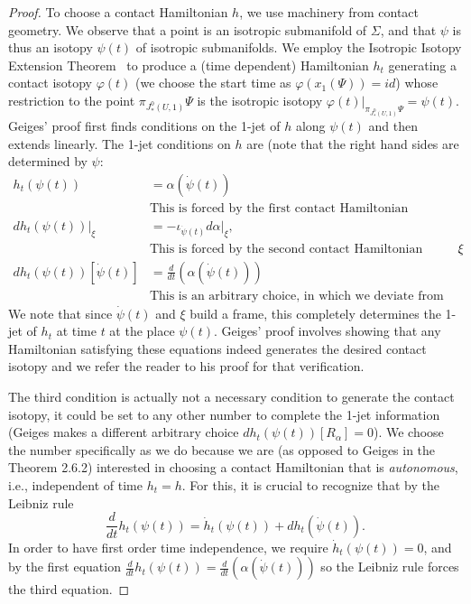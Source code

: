 \documentclass{amsart}
\theoremstyle{definition}
\theoremstyle{remark}
\numberwithin{equation}{section}
\begin{document}
\begin{proof}
    To choose a contact Hamiltonian $h$, we use machinery from contact geometry. We observe that a point is an isotropic submanifold of $\Sigma$, and that $\psi$ is thus an isotopy $\psi(t)$ of isotropic submanifolds. We employ the Isotropic Isotopy Extension Theorem~\cite[Theorem 2.6.2]{Geiges} to produce a (time dependent) Hamiltonian $h_t$ generating a contact isotopy $\varphi(t)$ (we choose the start time as $\varphi(x_1(\Psi))=id$) whose restriction to the point $\pi_{J^0_*(U,1)}\Psi$ is the isotropic isotopy $\varphi(t)|_{\pi_{J^0_*(U,1)}\Psi}=\psi(t)$. Geiges' proof first finds conditions on the 1-jet of $h$ along $\psi(t)$ and then extends linearly. The 1-jet conditions on $h$ are (note that the right hand sides are determined by $\psi$: 
    \begin{align*}
         h_t(\psi(t))&=\alpha(\dot\psi(t)) \\ &\mbox{This is forced by the first contact Hamiltonian equation.}\\
         dh_t(\psi(t))|_\xi &= -\iota_{\dot\psi(t)}d\alpha|_\xi, \\& \mbox{This is forced by the second contact Hamiltonian equation along $\xi$}.\\
         dh_t(\psi(t))[\dot\psi(t)]  &= \frac d{dt}\left(\alpha(\dot\psi(t))\right) \\ &\mbox{This is an arbitrary choice, in which we deviate from Geiges.}
    \end{align*}
    We note that since $\dot\psi(t)$ and $\xi$ build a frame, this completely determines the 1-jet of $h_t$ at time $t$ at the place $\psi(t)$. Geiges' proof involves showing that any Hamiltonian satisfying these equations indeed generates the desired contact isotopy and we refer the reader to his proof for that verification. 
    
    The third condition is actually not a necessary condition to generate the contact isotopy, it could be set to any other number to complete the 1-jet information (Geiges makes a different arbitrary choice $dh_t(\psi(t))[R_\alpha]=0$). We choose the number specifically as we do because we are (as opposed to Geiges in the Theorem 2.6.2) interested in choosing a contact Hamiltonian that is \emph{autonomous}, i.e., independent of time $h_t=h$. For this, it is crucial to recognize that by the Leibniz rule
    $$\frac d{dt} h_t(\psi(t)) = \dot h_t(\psi(t)) + dh_t(\dot\psi(t)).$$
    In order to have first order time independence, we require $\dot h_t(\psi(t))=0$, and by the first equation $\frac d{dt} h_t(\psi(t))=\frac d{dt}\left(\alpha(\dot\psi(t))\right)$ so the Leibniz rule forces the third equation. 
    

\end{proof}
\end{document}
